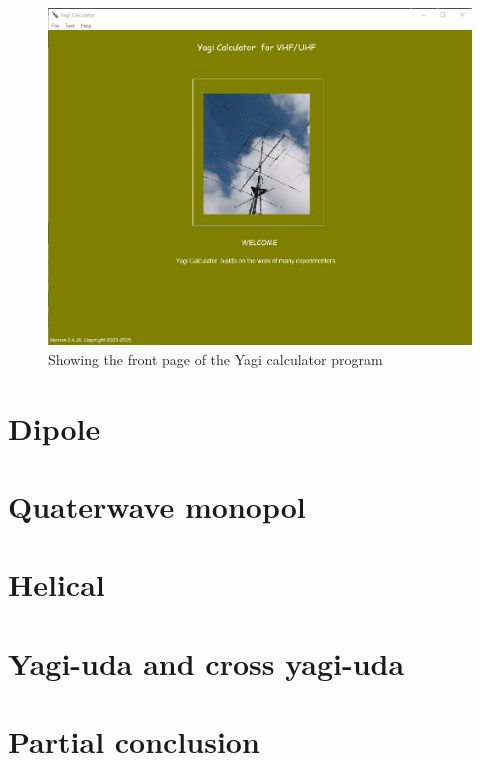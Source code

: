 \begin{figure}[h!]
\centering
\includegraphics[scale=0.5]{figures/YagiCalculator.PNG}
\caption{Showing the front page of the Yagi calculator program}
\end{figure}

\section{Dipole}

\section{Quaterwave monopol}
\section{Helical}

\section{Yagi-uda and cross yagi-uda}

\section{Partial conclusion}